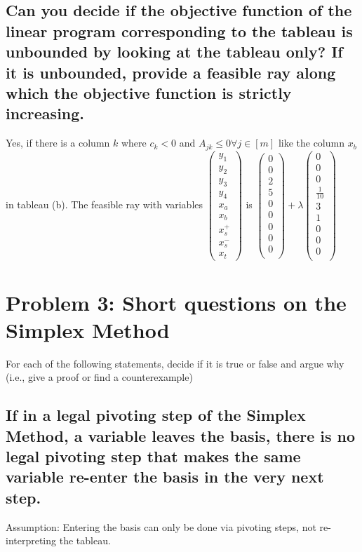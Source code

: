 \documentclass[12pt, a4]{article}
\begin{document}
\subsection{Can you decide if the objective function of the linear program corresponding to the tableau is unbounded by looking at the tableau only? If it is unbounded, provide a feasible ray along which the objective function is strictly increasing.}
Yes, if there is a column $k$ where $c_k < 0$ and $A_{jk} \leq 0 \forall j \in [m]$ like the column $x_b$ in tableau (b).
The feasible ray with variables $\begin{pmatrix}
y_1\\
y_2\\
y_3\\
y_4\\
x_a\\
x_b\\
x_s^+\\
x_s^-\\
x_t
\end{pmatrix}$ is $
\begin{pmatrix}
	0\\
	0\\
	2\\
	5\\
	0\\
	0\\
	0\\
	0\\
	0\\
\end{pmatrix} + \lambda \begin{pmatrix}
0\\
0\\
0\\
\frac{1}{10}\\
3\\
1\\
0\\
0\\
0\\
\end{pmatrix}  $
	
\section{Problem 3: Short questions on the Simplex Method}
	For each of the following statements, decide if it is true or false and argue why (i.e., give a proof or find a counterexample)
	\subsection{If in a legal pivoting step of the Simplex Method, a variable leaves the basis, there is no legal pivoting step that makes the same variable re-enter the basis in the very next step.}
	Assumption: Entering the basis can only be done via pivoting steps, not re-interpreting the tableau.
	
\end{document}
